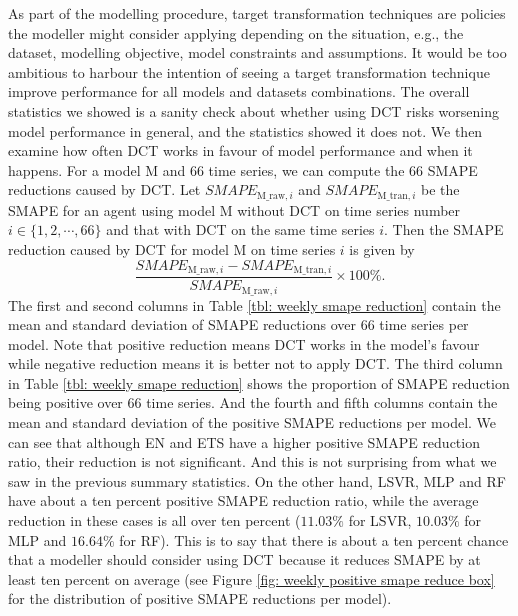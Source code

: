 As part of the modelling procedure, target transformation techniques are policies the modeller might consider applying depending on the situation, e.g., the dataset, modelling objective, model constraints and assumptions. It would be too ambitious to harbour the intention of seeing a target transformation technique improve performance for all models and datasets combinations. The overall statistics we showed is a sanity check about whether using DCT risks worsening model performance in general, and the statistics showed it does not. We then examine how often DCT works in favour of model performance and when it happens. For a model M and $66$ time series, we can compute the $66$ SMAPE reductions caused by DCT. Let $SMAPE_{\text{M\_raw}, i}$ and $SMAPE_{\text{M\_tran}, i}$ be the SMAPE for an agent using model M without DCT on time series number $i \in \{1, 2, \cdots, 66\}$ and that with DCT on the same time series $i$. Then the SMAPE reduction caused by DCT for model M on time series $i$ is given by
\begin{equation*}
    \frac{SMAPE_{\text{M\_raw}, i} - SMAPE_{\text{M\_tran}, i}}{SMAPE_{\text{M\_raw}, i}} \times 100 \%.
\end{equation*}
The first and second columns in Table \ref{tbl: weekly smape reduction} contain the mean and standard deviation of SMAPE reductions over $66$ time series per model. Note that positive reduction means DCT works in the model's favour while negative reduction means it is better not to apply DCT. The third column in Table \ref{tbl: weekly smape reduction} shows the proportion of SMAPE reduction being positive over $66$ time series. And the fourth and fifth columns contain the mean and standard deviation of the positive SMAPE reductions per model. We can see that although EN and ETS have a higher positive SMAPE reduction ratio, their reduction is not significant. And this is not surprising from what we saw in the previous summary statistics. On the other hand, LSVR, MLP and RF have about a ten percent positive SMAPE reduction ratio, while the average reduction in these cases is all over ten percent ($11.03\%$ for LSVR, $10.03\%$ for MLP and $16.64\%$ for RF). This is to say that there is about a ten percent chance that a modeller should consider using DCT because it reduces SMAPE by at least ten percent on average (see Figure \ref{fig: weekly positive smape reduce box} for the distribution of positive SMAPE reductions per model).
